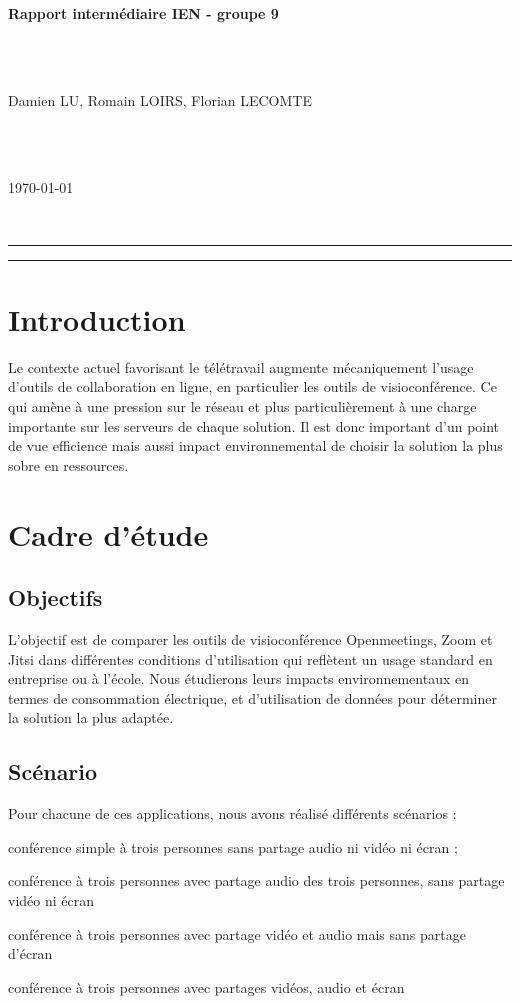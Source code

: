 \documentclass[11pt,a4paper]{article}
\begin{document}
\begin{huge}
\noindent \textbf{Rapport intermédiaire IEN - groupe 9}
\end{huge} 
\\ \\
\begin{Large}
Damien LU, Romain LOIRS, Florian LECOMTE
\end{Large} \\ \\
\begin{Large}
\today
\end{Large}
~\\
\hrule 
{}
\tableofcontents
\hrule
\section{Introduction}
Le contexte actuel favorisant le télétravail augmente mécaniquement l’usage d’outils de collaboration en ligne, en particulier les outils de visioconférence. Ce qui amène à une pression sur le réseau et plus particulièrement à une charge importante sur les serveurs de chaque solution. Il est donc important d’un point de vue efficience mais aussi impact environnemental de choisir la solution la plus sobre en ressources.
\section{Cadre d'étude}
\subsection{Objectifs}
L'objectif est de comparer les outils de visioconférence Openmeetings, Zoom et Jitsi dans différentes conditions d'utilisation qui reflètent un usage standard en entreprise ou à l'école. Nous étudierons leurs impacts environnementaux en termes de consommation électrique, et d'utilisation de données pour déterminer la solution la plus adaptée.
\subsection{Scénario}
Pour chacune de ces applications, nous avons réalisé différents scénarios :
\bi \item conférence simple à trois personnes sans partage audio ni vidéo ni écran ;
\item conférence à trois personnes avec partage audio des trois personnes, sans partage vidéo ni écran
\item conférence à trois personnes avec partage vidéo et audio mais sans partage d'écran
\item conférence à trois personnes avec partages vidéos, audio et écran \ei 
\end{document}
